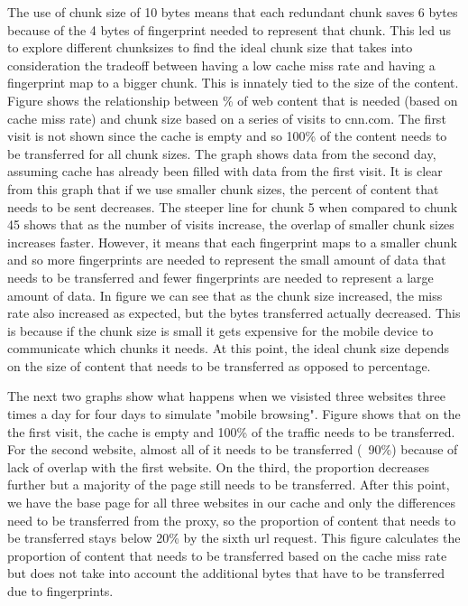 The use of chunk size of 10 bytes means that each redundant chunk saves 6 bytes because of the 4 bytes of fingerprint needed to represent that chunk. 
This led us to explore different chunksizes to find the ideal chunk size that takes into consideration the tradeoff between having a low cache miss rate and having a fingerprint map to a bigger chunk. 
This is innately tied to the size of the content. Figure shows the relationship between \% of web content that is needed (based on cache miss rate) and chunk size based on a series of visits to cnn.com. 
The first visit is not shown since the cache is empty and so 100\% of the content needs to be transferred for all chunk sizes. 
The graph shows data from the second day, assuming cache has already been filled with data from the first visit. 
It is clear from this graph that if we use smaller chunk sizes, the percent of content that needs to be sent decreases. 
The steeper line for chunk 5 when compared to chunk 45 shows that as the number of visits increase, the overlap of smaller chunk sizes increases faster.
However, it means that each fingerprint maps to a smaller chunk and so more fingerprints are needed to represent the small amount of data that needs to be transferred and fewer fingerprints are needed to represent a large amount of data. 
In figure we can see that as the chunk size increased, the miss rate also increased as expected, but the bytes transferred actually decreased. 
This is because if the chunk size is small it gets expensive for the mobile device to communicate which chunks it needs. 
At this point, the ideal chunk size depends on the size of content that needs to be transferred as opposed to percentage.

The next two graphs show what happens when we visisted three websites three times a day for four days to simulate "mobile browsing". 
Figure shows that on the the first visit, the cache is empty and 100\% of the traffic needs to be transferred. 
For the second website, almost all of it needs to be transferred (~90\%) because of lack of overlap with the first website. 
On the third, the proportion decreases further but a majority of the page still needs to be transferred. 
After this point, we have the base page for all three websites in our cache and only the differences need to be transferred from the proxy, so the proportion of content that needs to be transferred stays below 20\% by the sixth url request. 
This figure calculates the proportion of content that needs to be transferred based on the cache miss rate but does not take into account the additional bytes that have to be transferred due to fingerprints.

